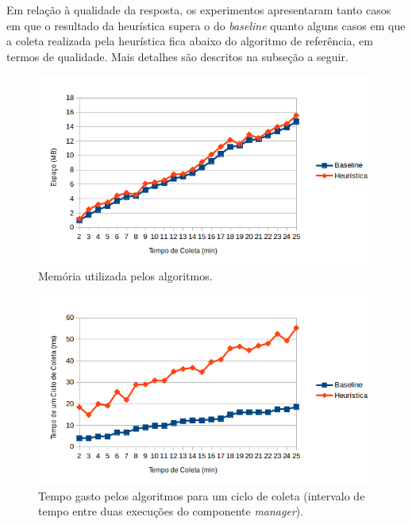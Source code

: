 \documentclass[a4paper,12pt,titlepage]{article}
\begin{document}
Em relação à qualidade da resposta, os experimentos apresentaram tanto casos em que o resultado da heurística supera o do \textit{baseline} quanto alguns casos em que a coleta realizada pela heurística fica abaixo do algoritmo de referência, em termos de qualidade. Mais detalhes são descritos na subseção a seguir.

\begin{figure}[H]
     \centering
     \includegraphics[scale=1]{figures/tempo.png}
     \caption{Memória utilizada pelos algoritmos.}
     \label{bsp}
\end{figure}


\begin{figure}[H]
     \centering
     \includegraphics[scale=1]{figures/tempo-ciclo2.png}
     \caption{Tempo gasto pelos algoritmos para um ciclo de coleta (intervalo de tempo entre duas execuções do componente \textit{manager}).}
     \label{bsp}
\end{figure}

\end{document}
